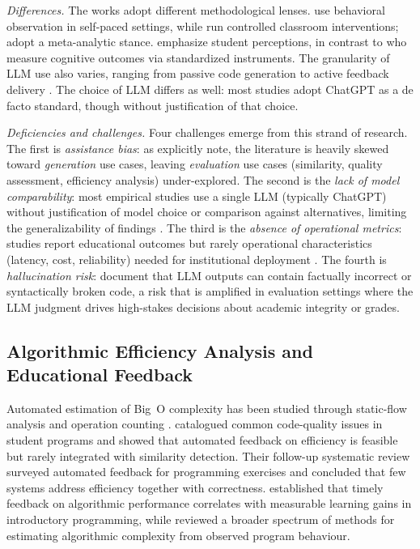 \documentclass[twocolumn,11pt]{article}
\begin{document}
    \textit{Differences.} The works adopt different methodological lenses. \citet{kazemitabaar2023novices} use behavioral observation in self-paced settings, while \citet{jost2024impact} run controlled classroom interventions; \citet{manorat2025artificial} adopt a meta-analytic stance. \citet{lepp2025does} emphasize student perceptions, in contrast to \citet{yilmaz2023effect} who measure cognitive outcomes via standardized instruments. The granularity of LLM use also varies, ranging from passive code generation \citep{kazemitabaar2023novices} to active feedback delivery \citep{jost2024impact}. The choice of LLM differs as well: most studies adopt ChatGPT as a de facto standard, though without justification of that choice.
     
    \textit{Deficiencies and challenges.} Four challenges emerge from this strand of research. The first is \emph{assistance bias}: as \citet{manorat2025artificial} explicitly note, the literature is heavily skewed toward \emph{generation} use cases, leaving \emph{evaluation} use cases (similarity, quality assessment, efficiency analysis) under-explored. The second is the \emph{lack of model comparability}: most empirical studies use a single LLM (typically ChatGPT) without justification of model choice or comparison against alternatives, limiting the generalizability of findings \citep{lepp2025does,jost2024impact}. The third is the \emph{absence of operational metrics}: studies report educational outcomes but rarely operational characteristics (latency, cost, reliability) needed for institutional deployment \citep{vanviet2024large}. The fourth is \emph{hallucination risk}: \citet{jiang2024survey} document that LLM outputs can contain factually incorrect or syntactically broken code, a risk that is amplified in evaluation settings where the LLM judgment drives high-stakes decisions about academic integrity or grades.
    \subsection{Algorithmic Efficiency Analysis and Educational Feedback}
    Automated estimation of Big~O complexity has been studied through static-flow analysis and operation counting \citep{cormen2022introduction,zenil2020review}. \citet{keuning2017code} catalogued common code-quality issues in student programs and showed that automated feedback on efficiency is feasible but rarely integrated with similarity detection. Their follow-up systematic review \citep{keuning2018systematic} surveyed automated feedback for programming exercises and concluded that few systems address efficiency together with correctness. \citet{malik2022enhancing} established that timely feedback on algorithmic performance correlates with measurable learning gains in introductory programming, while \citet{zenil2020review} reviewed a broader spectrum of methods for estimating algorithmic complexity from observed program behaviour.
     
\end{document}
